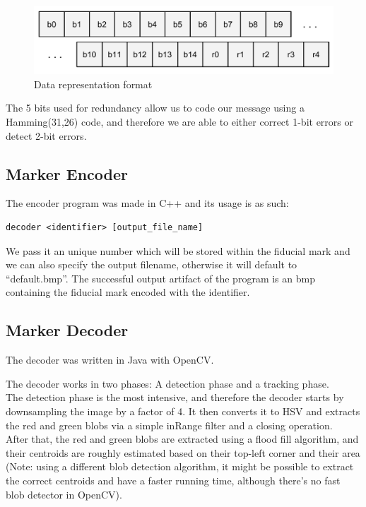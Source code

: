 \documentclass[DIV=calc, paper=a4, fontsize=11pt, twocolumn]{scrartcl}	 %
\begin{document}
\begin{figure}[!h]
    \centering
    \includegraphics[width=0.9\columnwidth]{bits.pdf}
    \caption{Data representation format}
    \label{fig:bits}
\end{figure}

The 5 bits used for redundancy allow us to code our message using a Hamming(31,26) code, and therefore we are able to either correct 1-bit errors or detect 2-bit errors.

\subsection*{Marker Encoder}

The encoder program was made in C++ and its usage is as such:
\begin{verbatim}
decoder <identifier> [output_file_name]
\end{verbatim}


We pass it an unique number which will be stored within the fiducial mark and we can also specify the output filename, otherwise it will default to ``default.bmp''. The successful output artifact of the program is an bmp containing the fiducial mark encoded with the identifier.

\subsection*{Marker Decoder}
The decoder was written in Java with OpenCV.

The decoder works in two phases: A detection phase and a tracking phase.\\


The detection phase is the most intensive, and therefore the decoder starts by downsampling the image by a factor of 4. It then converts it to HSV and extracts the red and green blobs via a simple inRange filter and a closing operation.\\


After that, the red and green blobs are extracted using a flood fill algorithm, and their centroids are roughly estimated based on their top-left corner and their area (Note: using a different blob detection algorithm, it might be possible to extract the correct centroids and have a faster running time, although there's no fast blob detector in OpenCV).\\
\end{document}
